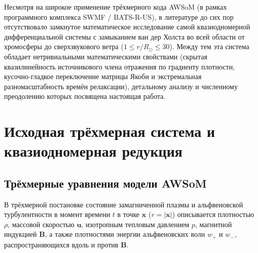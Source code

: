 \documentclass[11pt,a4paper]{article}
\begin{document}
Несмотря на широкое применение трёхмерного кода AWSoM (в рамках программного комплекса SWMF / BATS-R-US), в литературе до сих пор отсутствовало замкнутое математическое исследование самой квазиодномерной дифференциальной системы с замыканием ван дер Холста \cite{vanderHolst2014} во всей области от хромосферы до сверхзвукового ветра ($1 \le r/R_\odot \le 30$). Между тем эта система обладает нетривиальными математическими свойствами (скрытая квазилинейность источникового члена отражения по градиенту плотности, кусочно-гладкое переключение матрицы Якоби и экстремальная разномасштабность времён релаксации), детальному анализу и численному преодолению которых посвящена настоящая работа.

\section{Исходная трёхмерная система и квазиодномерная редукция}

\subsection{Трёхмерные уравнения модели AWSoM}

В трёхмерной постановке \cite{Sokolov2013,vanderHolst2014} состояние замагниченной плазмы и альфвеновской турбулентности в момент времени $t$ в точке $\bm{x}$ ($r = |\bm{x}|$) описывается плотностью $\rho$, массовой скоростью $\bm{u}$, изотропным тепловым давлением $p$, магнитной индукцией $\bm{B}$, а также плотностями энергии альфвеновских волн $w_+$ и $w_-$, распространяющихся вдоль и против $\bm{B}$.
\end{document}
